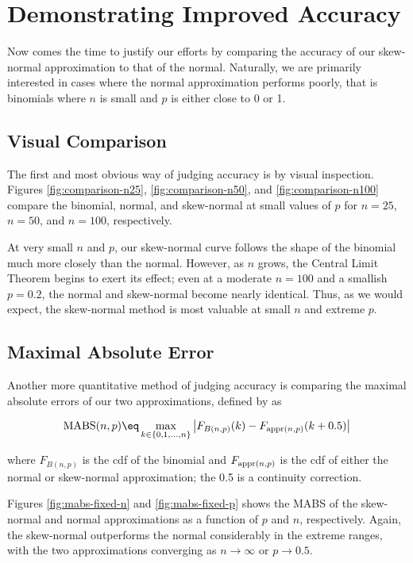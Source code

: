 \section{Demonstrating Improved Accuracy}
\label{sec:accuracy}

Now comes the time to justify our efforts by comparing the accuracy of our
skew-normal approximation to that of the normal. Naturally, we are primarily
interested in cases where the normal approximation performs poorly, that is
binomials where $n$ is small and $p$ is either close to 0 or 1.\footnotemark


\subsection{Visual Comparison}

The first and most obvious way of judging accuracy is by visual inspection.
Figures \ref{fig:comparison-n25}, \ref{fig:comparison-n50}, and
\ref{fig:comparison-n100} compare the binomial, normal, and skew-normal at
small values of $p$ for $n=25$, $n=50$, and $n=100$, respectively.

At very small $n$ and $p$, our skew-normal curve follows the shape of the
binomial much more closely than the normal. However, as $n$ grows, the Central
Limit Theorem begins to exert its effect; even at a moderate $n = 100$ and a
smallish $p = 0.2$, the normal and skew-normal become nearly identical. Thus,
as we would expect, the skew-normal method is most valuable at small $n$ and
extreme $p$.

\subsection{Maximal Absolute Error}
\label{subsec:mabs}

Another more quantitative method of judging accuracy is comparing the maximal
absolute errors of our two approximations, defined by \citet{mabs} as

\begin{equation}
  \textnormal{MABS}(n, p) \eq \max_{k \in \{0, 1,...,n\}} \left| F_{B(n,p)} (k) -  F_{\textnormal{appr}(n,p)}(k + 0.5) \right|
\end{equation}

where $F_{B(n,p)}$ is the cdf of the binomial and $F_{\textnormal{appr}(n,p)}$
is the cdf of either the normal or skew-normal approximation; the 0.5 is a
continuity correction.

Figures \ref{fig:mabs-fixed-n} and \ref{fig:mabs-fixed-p} shows the MABS of the
skew-normal and normal approximations as a function of $p$ and $n$,
respectively. Again, the skew-normal outperforms the normal considerably in the
extreme ranges, with the two approximations converging as $n \rightarrow
\infty$ or $p \rightarrow 0.5$.
